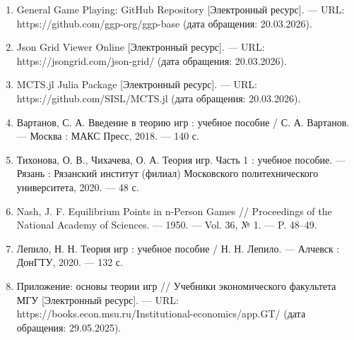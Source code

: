 \begin{enumerate}[label=\arabic*.]
  \item General Game Playing: GitHub Repository [Электронный ресурс]. — URL: https://github.com/ggp-org/ggp-base (дата обращения: 20.03.2026).
  \item Json Grid Viewer Online [Электронный ресурс]. — URL: https://jsongrid.com/json-grid/ (дата обращения: 20.03.2026).
  \item MCTS.jl Julia Package [Электронный ресурс]. — URL: https://github.com/SISL/MCTS.jl (дата обращения: 20.03.2026).
  \item Вартанов, С. А. Введение в теорию игр : учебное пособие / С. А. Вартанов. — Москва : МАКС Пресс, 2018. — 140 с.
  \item Тихонова, О. В., Чихачева, О. А. Теория игр. Часть 1 : учебное пособие. — Рязань : Рязанский институт (филиал) Московского политехнического университета, 2020. — 48 с.
  \item Nash, J. F. Equilibrium Points in n-Person Games // Proceedings of the National Academy of Sciences. — 1950. — Vol. 36, № 1. — P. 48–49.
  \item Лепило, Н. Н. Теория игр : учебное пособие / Н. Н. Лепило. — Алчевск : ДонГТУ, 2020. — 132 с.
  \item Приложение: основы теории игр // Учебники экономического факультета МГУ [Электронный ресурс]. — URL: https://books.econ.msu.ru/Institutional-economics/app.GT/ (дата обращения: 29.05.2025).
\end{enumerate}

